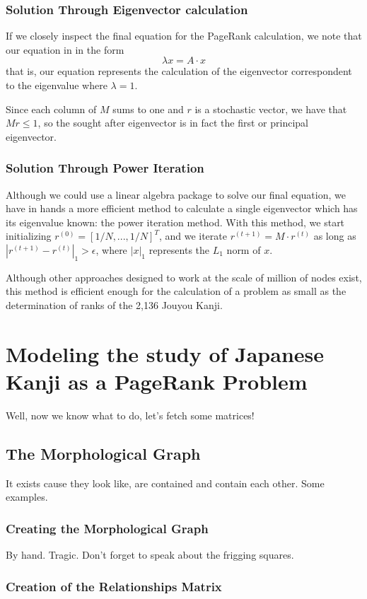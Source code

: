 \subsubsection{Solution Through Eigenvector calculation}
If we closely inspect the final equation for the PageRank calculation, we note that our equation in in the form
$$\lambda x = A \cdot x$$
that is, our equation represents the calculation of the eigenvector correspondent to the eigenvalue where $\lambda = 1$.

Since each column of $M$ sums to one and $r$ is a stochastic vector, we have that $Mr \leq 1$, so the sought after eigenvector is in fact the first or principal eigenvector. 

\subsubsection{Solution Through Power Iteration}
Although we could use a linear algebra package to solve our final equation, we have in hands a more efficient method to calculate a single eigenvector which has its eigenvalue known: the power iteration method. With this method, we start initializing $r^{(0)} = [1/N,...,1/N]^T$, and we iterate $r^{(t+1)} = M \cdot r^{(t)}$ as long as $|r^{(t+1)} - r^{(t)}|_1 > \epsilon$, where $|x|_1$ represents the $L_1$ norm of $x$\cite{arasu2002pagerank}.

Although other approaches designed to work at the scale of million of nodes exist, this method is efficient enough for the calculation of a problem as small as the determination of ranks of the 2,136 Jouyou Kanji.

\section{Modeling the study of Japanese Kanji as a PageRank Problem}
Well, now we know what to do, let's fetch some matrices!
\subsection{The Morphological Graph}
It exists cause they look like, are contained and contain each other.
Some examples.
\subsubsection{Creating the Morphological Graph}
By hand. Tragic.
Don't forget to speak about the frigging squares.
\subsubsection{Creation of the Relationships Matrix}
